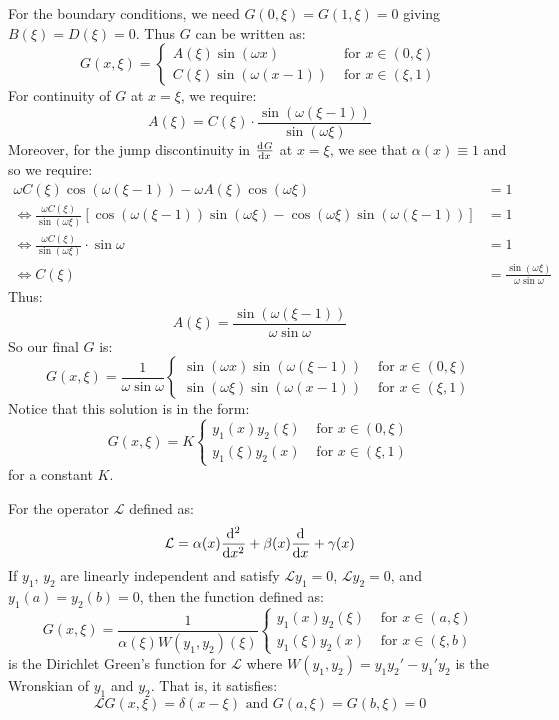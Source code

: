\documentclass[../main.tex]{subfiles}
\begin{document}
\begin{example}
  For the boundary conditions, we need $G(0, \xi) = G(1, \xi) = 0$ giving $B(\xi) = D(\xi) = 0$.
  Thus $G$ can be written as:
  \[
    G(x, \xi) = \begin{cases}
    A(\xi)\sin(\omega x) & \text{ for } x \in (0, \xi) \\
    C(\xi)\sin(\omega(x - 1)) & \text{ for } x \in (\xi, 1)
    \end{cases}
  \]
  For continuity of $G$ at $x = \xi$, we require:
  \[
    A(\xi) = C(\xi) \cdot \frac{\sin(\omega(\xi - 1))}{\sin(\omega \xi)}
  \]
  Moreover, for the jump discontinuity in $\deriv{G}{x}$ at $x = \xi$, we see that $\alpha(x) \equiv 1$ and so we require:
  \begin{align*}
    \omega C(\xi) \cos(\omega(\xi - 1)) - \omega A(\xi) \cos(\omega \xi) &= 1 \\
    \iff \frac{\omega C(\xi)}{\sin(\omega \xi)}[\cos(\omega(\xi - 1))\sin(\omega \xi) - \cos(\omega \xi) \sin(\omega(\xi - 1))] &= 1 \\
    \iff \frac{\omega C(\xi)}{\sin(\omega \xi)} \cdot \sin \omega &= 1 \\
    \iff C(\xi) &= \frac{\sin(\omega \xi)}{\omega \sin \omega}
  \end{align*}
  Thus:
  \[
    A(\xi) = \frac{\sin(\omega(\xi - 1))}{\omega \sin \omega}
  \]
  So our final $G$ is:
  \[
    G(x, \xi) = \frac{1}{\omega \sin \omega} \begin{cases}
    \sin(\omega x) \sin(\omega(\xi - 1)) & \text{ for } x \in (0, \xi) \\
    \sin(\omega \xi) \sin(\omega(x -  1)) & \text{ for } x \in (\xi, 1)
    \end{cases}
  \]
  Notice that this solution is in the form:
  \[
    G(x, \xi) = K \begin{cases}
    y_1(x)y_2(\xi) & \text{ for } x \in (0, \xi) \\
    y_1(\xi)y_2(x) & \text{ for } x \in (\xi, 1)
    \end{cases}
  \]
  for a constant $K$.
\end{example}
\begin{proposition}
  For the operator $\mathcal{L}$ defined as: \label{genDGF}
  \[
    \mathcal{L} = \alpha(x) \deriv[2]{}{x} + \beta(x) \deriv{}{x} + \gamma(x)
  \]
  If $y_1$, $y_2$ are linearly independent and satisfy $\mathcal{L}y_1 = 0 $, $\mathcal{L}y_2 = 0$, and $y_1(a) = y_2(b) = 0$, then the function defined as:
  \[
    G(x, \xi) = \frac{1}{\alpha(\xi) W(y_1, y_2)(\xi)} \begin{cases}
    y_1(x)y_2(\xi) & \text{ for } x \in (a, \xi) \\
    y_1(\xi)y_2(x) & \text{ for } x \in (\xi, b)
    \end{cases}
  \]
  is the Dirichlet Green's function for $\mathcal{L}$ where $W(y_1, y_2) = y_1 y_2' - y_1' y_2$ is the Wronskian of $y_1$ and $y_2$.
  That is, it satisfies:
  \[
    \mathcal{L} G(x, \xi) = \delta(x - \xi) \text{ and } G(a, \xi) = G(b, \xi) = 0
  \]
\end{proposition}
\end{document}
